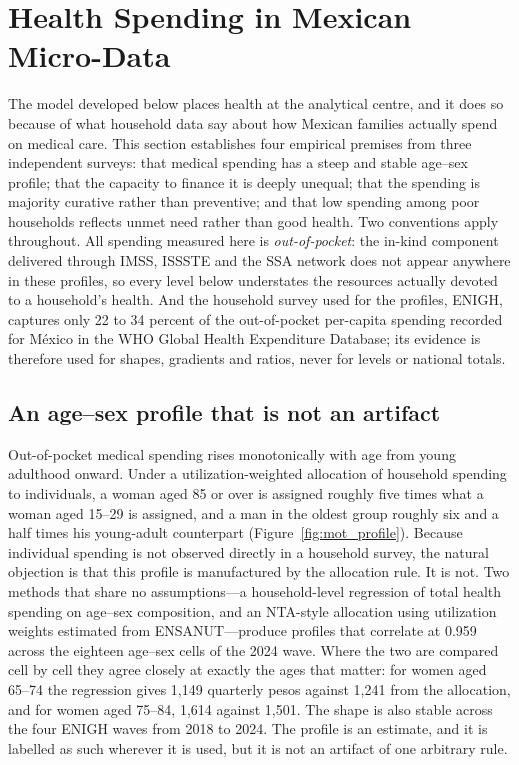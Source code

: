 \section{Health Spending in Mexican Micro-Data}
\label{sec:motivation}

The model developed below places health at the analytical centre, and it does so
because of what household data say about how Mexican families actually spend on
medical care. This section establishes four empirical premises from three
independent surveys: that medical spending has a steep and stable age--sex
profile; that the capacity to finance it is deeply unequal; that the spending is
majority curative rather than preventive; and that low spending among poor
households reflects unmet need rather than good health. Two conventions apply
throughout. All spending measured here is \emph{out-of-pocket}: the in-kind
component delivered through IMSS, ISSSTE and the SSA network does not appear
anywhere in these profiles, so every level below understates the resources
actually devoted to a household's health. And the household survey used for the
profiles, ENIGH, captures only 22 to 34 percent of the out-of-pocket per-capita
spending recorded for M\'exico in the WHO Global Health Expenditure Database;
its evidence is therefore used for shapes, gradients and ratios, never for
levels or national totals.

\subsection{An age--sex profile that is not an artifact}
\label{subsec:mot_profile}

Out-of-pocket medical spending rises monotonically with age from young adulthood
onward. Under a utilization-weighted allocation of household spending to
individuals, a woman aged 85 or over is assigned roughly five times what a woman
aged 15--29 is assigned, and a man in the oldest group roughly six and a half
times his young-adult counterpart (Figure~\ref{fig:mot_profile}). Because
individual spending is not observed directly in a household survey, the natural
objection is that this profile is manufactured by the allocation rule. It is
not. Two methods that share no assumptions---a household-level regression of
total health spending on age--sex composition, and an NTA-style allocation using
utilization weights estimated from ENSANUT---produce profiles that correlate at
0.959 across the eighteen age--sex cells of the 2024 wave. Where the two are
compared cell by cell they agree closely at exactly the ages that matter: for
women aged 65--74 the regression gives 1{,}149 quarterly pesos against 1{,}241
from the allocation, and for women aged 75--84, 1{,}614 against 1{,}501. The
shape is also stable across the four ENIGH waves from 2018 to 2024. The profile
is an estimate, and it is labelled as such wherever it is used, but it is not an
artifact of one arbitrary rule.

